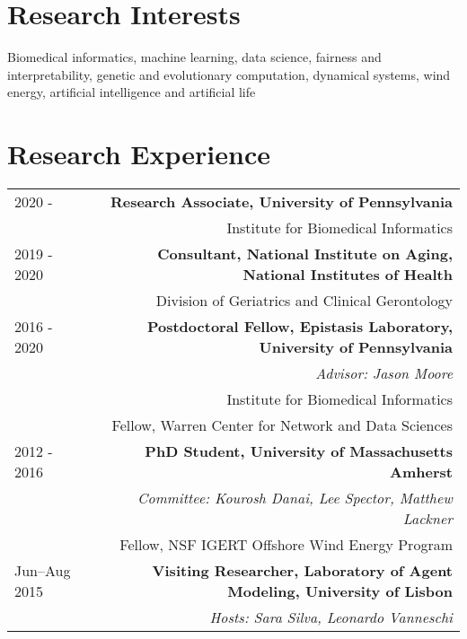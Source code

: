 \section*{Research Interests}
Biomedical informatics, 
machine learning, 
data science, 
fairness and interpretability,
genetic and evolutionary computation,  
dynamical systems, 
wind energy, 
artificial intelligence and 
artificial life
 
\section*{Research Experience}

\begin{tabular}{L!{\VRule}R}
2020 - & {\bf Research Associate,  University of Pennsylvania} \\
& Institute for Biomedical Informatics \\
2019 - 2020  & {\bf Consultant, National Institute on Aging, National Institutes of Health} \\
& Division of Geriatrics and Clinical Gerontology \\
2016 - 2020 & {\bf Postdoctoral Fellow, Epistasis Laboratory, University of Pennsylvania} \\
& {\it Advisor: Jason Moore} \\
& Institute for Biomedical Informatics \\
& Fellow, Warren Center for Network and Data Sciences \\
2012 - 2016 & {\bf PhD Student, University of Massachusetts Amherst} \\
& {\it Committee: Kourosh Danai, Lee Spector, Matthew Lackner} \\
& Fellow, NSF IGERT Offshore Wind Energy Program \\
Jun--Aug 2015& {\bf Visiting Researcher, Laboratory of Agent Modeling, University of Lisbon} \\
&{\it Hosts: Sara Silva, Leonardo Vanneschi} \\

\end{tabular}
